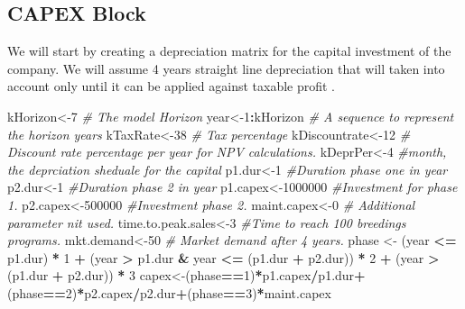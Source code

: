 \documentclass[
]{article}
\newenvironment{Shaded}{\begin{snugshade}}{\end{snugshade}}
\newcommand{\CommentTok}[1]{\textcolor[rgb]{0.56,0.35,0.01}{\textit{#1}}}
\newcommand{\DecValTok}[1]{\textcolor[rgb]{0.00,0.00,0.81}{#1}}
\newcommand{\NormalTok}[1]{#1}
\newcommand{\OperatorTok}[1]{\textcolor[rgb]{0.81,0.36,0.00}{\textbf{#1}}}
\newcommand{\StringTok}[1]{\textcolor[rgb]{0.31,0.60,0.02}{#1}}
\begin{document}
\hypertarget{capex-block}{%
\subsection{CAPEX Block}\label{capex-block}}

We will start by creating a depreciation matrix for the capital
investment of the company. We will assume 4 years straight line
depreciation that will taken into account only until it can be applied
against taxable profit .

\begin{Shaded}
\begin{Highlighting}[]
\NormalTok{kHorizon<-}\DecValTok{7} \CommentTok{# The model Horizon}
\NormalTok{year<-}\DecValTok{1}\OperatorTok{:}\NormalTok{kHorizon }\CommentTok{# A sequence to represent the horizon years}
\NormalTok{kTaxRate<-}\DecValTok{38} \CommentTok{# Tax percentage}
\NormalTok{kDiscountrate<-}\DecValTok{12} \CommentTok{# Discount rate percentage per year for NPV calculations.}
\NormalTok{kDeprPer<-}\DecValTok{4} \CommentTok{#month, the deprciation sheduale for the capital}
\NormalTok{p1.dur<-}\DecValTok{1} \CommentTok{#Duration phase one in year}
\NormalTok{p2.dur<-}\DecValTok{1} \CommentTok{#Duration phase 2 in year}
\NormalTok{p1.capex<-}\DecValTok{1000000} \CommentTok{#Investment for phase 1.}
\NormalTok{p2.capex<-}\DecValTok{500000} \CommentTok{#Investment phase 2.}
\NormalTok{maint.capex<-}\DecValTok{0} \CommentTok{# Additional parameter nit used.}
\NormalTok{time.to.peak.sales<-}\DecValTok{3} \CommentTok{#Time to reach 100 breedings programs.}
\NormalTok{mkt.demand<-}\DecValTok{50} \CommentTok{# Market demand after 4 years.}
\NormalTok{phase <-}\StringTok{ }\NormalTok{(year }\OperatorTok{<=}\StringTok{ }\NormalTok{p1.dur) }\OperatorTok{*}\StringTok{ }\DecValTok{1} \OperatorTok{+}
\NormalTok{(year }\OperatorTok{>}\StringTok{ }\NormalTok{p1.dur }\OperatorTok{&}\StringTok{ }\NormalTok{year }\OperatorTok{<=}\StringTok{ }\NormalTok{(p1.dur }\OperatorTok{+}\StringTok{ }\NormalTok{p2.dur)) }\OperatorTok{*}\StringTok{ }\DecValTok{2} \OperatorTok{+}
\NormalTok{(year }\OperatorTok{>}\StringTok{ }\NormalTok{(p1.dur }\OperatorTok{+}\StringTok{ }\NormalTok{p2.dur)) }\OperatorTok{*}\StringTok{ }\DecValTok{3}
\NormalTok{capex<-(phase}\OperatorTok{==}\DecValTok{1}\NormalTok{)}\OperatorTok{*}\NormalTok{p1.capex}\OperatorTok{/}\NormalTok{p1.dur}\OperatorTok{+}\NormalTok{(phase}\OperatorTok{==}\DecValTok{2}\NormalTok{)}\OperatorTok{*}\NormalTok{p2.capex}\OperatorTok{/}\NormalTok{p2.dur}\OperatorTok{+}\NormalTok{(phase}\OperatorTok{==}\DecValTok{3}\NormalTok{)}\OperatorTok{*}\NormalTok{maint.capex}

\end{Highlighting}
\end{Shaded}
\end{document}
